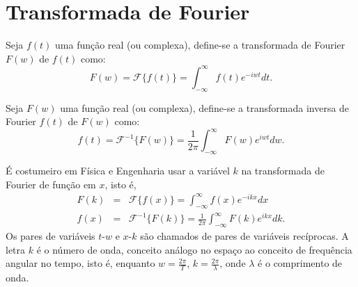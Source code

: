 \section{Transformada de Fourier}
\begin{defn}Seja $f(t)$ uma função real (ou complexa), define-se a transformada de Fourier $F(w)$ de $f(t)$ como:
$$
F(w)=\mathcal{F}\{f(t)\}=\int_{-\infty}^\infty f(t)e^{-iwt}dt.
$$
\end{defn}
\begin{defn}Seja $F(w)$ uma função real (ou complexa), define-se a transformada inversa de Fourier $f(t)$ de $F(w)$ como:
$$
f(t)=\mathcal{F}^{-1}\{F(w)\}=\frac{1}{2\pi}\int_{-\infty}^\infty F(w)e^{iwt}dw.
$$
\end{defn}
\begin{obs}É costumeiro em Física e Engenharia usar a variável $k$ na transformada de Fourier de função em $x$, isto é,
\begin{eqnarray*}
F(k)&=&\mathcal{F}\{f(x)\}=\int_{-\infty}^\infty f(x)e^{-ikx}dx\\
f(x)&=&\mathcal{F}^{-1}\{F(k)\}=\frac{1}{2\pi}\int_{-\infty}^\infty F(k)e^{ikx}dk.
\end{eqnarray*}
Os pares de variáveis $t$-$w$ e $x$-$k$ são chamados de pares de variáveis recíprocas. A letra $k$ é o número de onda, conceito análogo no espaço ao conceito de frequência angular no tempo, isto é, enquanto $w=\frac{2\pi}{T}$, $k=\frac{2\pi}{\lambda}$, onde $\lambda$ é o comprimento de onda.	
\end{obs}
